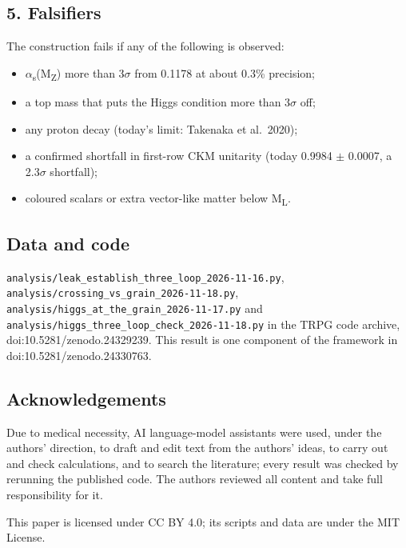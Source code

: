 \documentclass[
  11pt,
]{article}
\providecommand{\tightlist}{%
  \setlength{\itemsep}{0pt}\setlength{\parskip}{0pt}}
\begin{document}
\hypertarget{falsifiers}{%
\subsection{5. Falsifiers}\label{falsifiers}}

The construction fails if any of the following is observed:

\begin{itemize}
\tightlist
\item
  \ensuremath{\alpha}\textsubscript{s}(M\textsubscript{Z}) more than 3\ensuremath{\sigma} from 0.1178 at about 0.3\% precision;
\item
  a top mass that puts the Higgs condition more than 3\ensuremath{\sigma} off;
\item
  any proton decay (today's limit: Takenaka et al.~2020);
\item
  a confirmed shortfall in first-row CKM unitarity (today 0.9984 \ensuremath{\pm} 0.0007, a 2.3\ensuremath{\sigma} shortfall);
\item
  coloured scalars or extra vector-like matter below M\textsubscript{L}.
\end{itemize}

\hypertarget{data-and-code}{%
\subsection{Data and code}\label{data-and-code}}

\texttt{analysis/leak\_establish\_three\_loop\_2026-11-16.py}, \texttt{analysis/crossing\_vs\_grain\_2026-11-18.py}, \texttt{analysis/higgs\_at\_the\_grain\_2026-11-17.py} and \texttt{analysis/higgs\_three\_loop\_check\_2026-11-18.py} in the TRPG code archive, doi:10.5281/zenodo.24329239. This result is one component of the framework in doi:10.5281/zenodo.24330763.

\hypertarget{acknowledgements}{%
\subsection{Acknowledgements}\label{acknowledgements}}

Due to medical necessity, AI language-model assistants were used, under the authors' direction, to draft and edit text from the authors' ideas, to carry out and check calculations, and to search the literature; every result was checked by rerunning the published code. The authors reviewed all content and take full responsibility for it.

This paper is licensed under CC BY 4.0; its scripts and data are under the MIT License.
\end{document}
